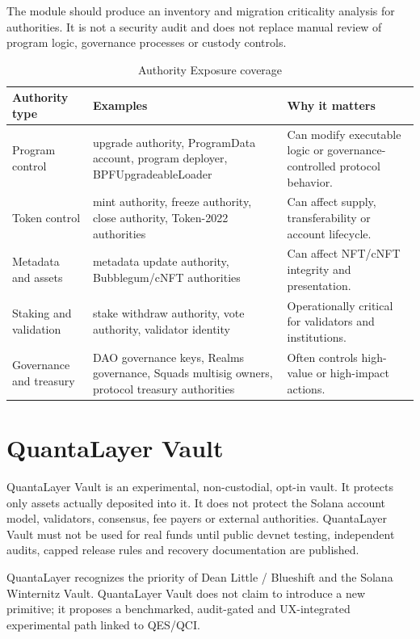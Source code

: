 \documentclass[11pt,a4paper,oneside,parskip=false]{scrartcl}
\newcommand{\QES}{\textsc{QES}}
\newcommand{\QCI}{\textsc{QCI}}
\begin{document}
The module should produce an inventory and migration criticality analysis for authorities. It is not a security audit and does not replace manual review of program logic, governance processes or custody controls.

\begin{table}[htbp]
\centering
\caption{Authority Exposure coverage}
\label{tab:authority-exposure}
\small
\begin{tabularx}{\textwidth}{L{0.30\textwidth}Y Y}
\toprule
\textbf{Authority type} & \textbf{Examples} & \textbf{Why it matters} \\
\midrule
Program control & upgrade authority, ProgramData account, program deployer, BPFUpgradeableLoader & Can modify executable logic or governance-controlled protocol behavior. \\
Token control & mint authority, freeze authority, close authority, Token-2022 authorities & Can affect supply, transferability or account lifecycle. \\
Metadata and assets & metadata update authority, Bubblegum/cNFT authorities & Can affect NFT/cNFT integrity and presentation. \\
Staking and validation & stake withdraw authority, vote authority, validator identity & Operationally critical for validators and institutions. \\
Governance and treasury & DAO governance keys, Realms governance, Squads multisig owners, protocol treasury authorities & Often controls high-value or high-impact actions. \\
\bottomrule
\end{tabularx}
\end{table}

\section{QuantaLayer Vault}

\begin{warningbox}
\sffamily\small
QuantaLayer Vault is an experimental, non-custodial, opt-in vault. It protects only assets actually deposited into it. It does not protect the Solana account model, validators, consensus, fee payers or external authorities. QuantaLayer Vault must not be used for real funds until public devnet testing, independent audits, capped release rules and recovery documentation are published.
\end{warningbox}

QuantaLayer recognizes the priority of Dean Little / Blueshift and the Solana Winternitz Vault. QuantaLayer Vault does not claim to introduce a new primitive; it proposes a benchmarked, audit-gated and UX-integrated experimental path linked to \QES{}/\QCI{}.
\end{document}
